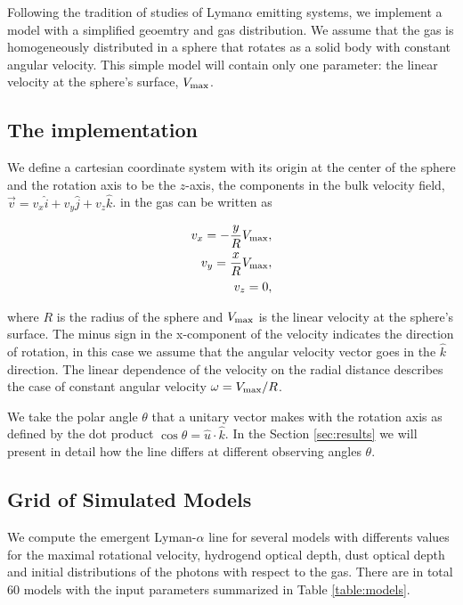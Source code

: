 \documentclass[usenatbib]{mn2e}
\begin{document}
Following the tradition of studies of Lyman$\alpha$ emitting systems,
we implement a model with a simplified geoemtry and gas
distribution. We assume that the gas is homogeneously distributed in a
sphere that rotates as a solid body with constant angular
velocity. This simple model will contain only one parameter: the
linear velocity at the sphere's surface, $V_{\rm max}$.

\subsection{The implementation}
 We define a cartesian coordinate
system with its origin at the center of the sphere and the rotation
axis to be the $z$-axis, the components in the bulk velocity field, $\vec{v}
= v_{x}\hat{i} + v_{y}\hat{j} + v_{z}\hat{k}$. in the gas can be written as 
 
\begin{subequations}
\begin{align}
    v_{x}=-\dfrac{y}{R}V_{\rm max}, \label{subeq1}\\
    v_{y}=\dfrac{x}{R}V_{\rm max}, \label{subeq2}\\
    v_{z}=0, \label{subeq3}
\end{align}
\end{subequations}

where $R$ is the radius of the sphere and $V_{\rm max}$ is the linear
velocity at the sphere's surface. The minus sign in the x-component of
the velocity indicates the direction of rotation, in this case we
assume that the angular velocity vector goes in the $\hat{k}$
direction.  The linear dependence of the velocity on the radial
distance describes the case of constant angular velocity
$\omega=V_{\rm max}/R$.  

We take the polar angle $\theta$ that a unitary vector makes with the
rotation axis as defined by the dot product $\cos\theta =
{\hat{u}\cdot\hat{k}}$. In the Section \ref{sec:results} we will
present in detail how the line differs at different observing angles
$\theta$. 



\subsection{Grid of Simulated Models}
\label{sec:models}

We compute the emergent Lyman-$\alpha$ line for several models with
differents values for the maximal rotational velocity, hydrogend optical
depth, dust optical depth and initial distributions of the photons
with respect to the gas. There are in total 60 models with the input
parameters summarized in Table  \ref{table:models}. 
\end{document}
